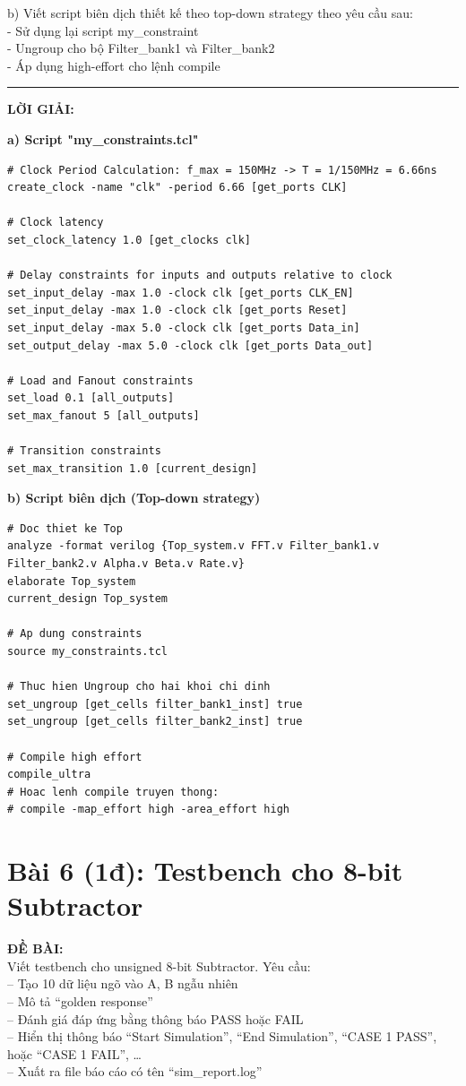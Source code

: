 \documentclass[12pt,a4paper]{article}
\begin{document}
b) Viết script biên dịch thiết kế theo top-down strategy theo yêu cầu sau:\\
- Sử dụng lại script my\_constraint\\
- Ungroup cho bộ Filter\_bank1 và Filter\_bank2\\
- Áp dụng high-effort cho lệnh compile

\hrule\vspace{0.5cm}
\textbf{LỜI GIẢI:}

\textbf{a) Script "my\_constraints.tcl"}

\begin{lstlisting}[style=tclstyle]
# Clock Period Calculation: f_max = 150MHz -> T = 1/150MHz = 6.66ns
create_clock -name "clk" -period 6.66 [get_ports CLK]

# Clock latency
set_clock_latency 1.0 [get_clocks clk]

# Delay constraints for inputs and outputs relative to clock
set_input_delay -max 1.0 -clock clk [get_ports CLK_EN]
set_input_delay -max 1.0 -clock clk [get_ports Reset]
set_input_delay -max 5.0 -clock clk [get_ports Data_in]
set_output_delay -max 5.0 -clock clk [get_ports Data_out]

# Load and Fanout constraints
set_load 0.1 [all_outputs]
set_max_fanout 5 [all_outputs]

# Transition constraints
set_max_transition 1.0 [current_design]
\end{lstlisting}

\textbf{b) Script biên dịch (Top-down strategy)}

\begin{lstlisting}[style=tclstyle]
# Doc thiet ke Top
analyze -format verilog {Top_system.v FFT.v Filter_bank1.v Filter_bank2.v Alpha.v Beta.v Rate.v}
elaborate Top_system
current_design Top_system

# Ap dung constraints
source my_constraints.tcl

# Thuc hien Ungroup cho hai khoi chi dinh
set_ungroup [get_cells filter_bank1_inst] true
set_ungroup [get_cells filter_bank2_inst] true

# Compile high effort
compile_ultra
# Hoac lenh compile truyen thong:
# compile -map_effort high -area_effort high
\end{lstlisting}

\section{Bài 6 (1đ): Testbench cho 8-bit Subtractor}
\textbf{ĐỀ BÀI:} \\
Viết testbench cho unsigned 8-bit Subtractor. Yêu cầu:\\
– Tạo 10 dữ liệu ngõ vào A, B ngẫu nhiên\\
– Mô tả “golden response”\\
– Đánh giá đáp ứng bằng thông báo PASS hoặc FAIL\\
– Hiển thị thông báo “Start Simulation”, “End Simulation”, “CASE 1 PASS”, hoặc “CASE 1 FAIL”, …\\
– Xuất ra file báo cáo có tên “sim\_report.log”
\end{document}
